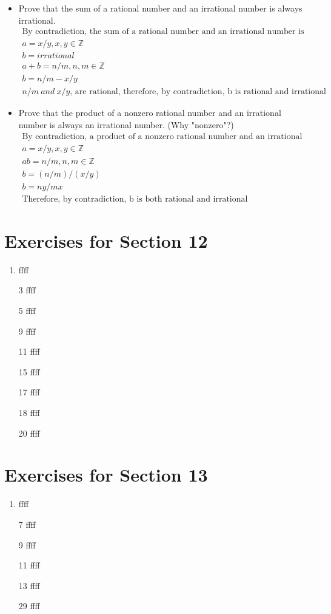 \documentclass[12pt]{article}
\begin{document}
\begin{itemize}
	\item Prove that the sum of a rational number and an irrational number is always irrational.
	    \begin{equation*}
	    	\begin{split}
		    \text{By contradiction, the sum of a rational number and an irrational number is always rational}\\
		    a = x/y, x,y \in \mathbb{Z}\\
		    b = irrational\\
		    a + b = n/m, n, m \in \mathbb{Z}\\
		    b = n/m - x/y\\
		    \text{$n/m\ and\ x/y$, are rational, therefore, by contradiction, b is rational and irrational }
	    	\end{split}
	    \end{equation*}
	\item Prove that the product of a nonzero rational number and an irrational number is always an irrational number. (Why "nonzero"?)
	    \begin{equation*}
	    	\begin{split}
		    \text{By contradiction, a product of a nonzero rational number and an irrational number is always a rational number}\\
		    a = x/y, x, y \in \mathbb{Z}\\
		    ab = n/m, n, m \in \mathbb{Z}\\
		    b = (n/m)/(x/y)\\
		    b = ny/mx\\
		    \text{Therefore, by contradiction, b is both rational and irrational}
	    	\end{split}
	    \end{equation*}
\end{itemize}
\section*{Exercises for Section 12}
\begin{enumerate}
	\item ffff
	\item [3] ffff
	\item [5] ffff
	\item [9] ffff
	\item [11] ffff
	\item [15] ffff
	\item [17] ffff
	\item [18] ffff
	\item [20] ffff
\end{enumerate}
\section*{Exercises for Section 13}
\begin{enumerate}
	\item ffff
	\item [7] ffff
	\item [9] ffff
	\item [11] ffff
	\item [13] ffff
	\item [29] ffff
\end{enumerate}
\end{document}
